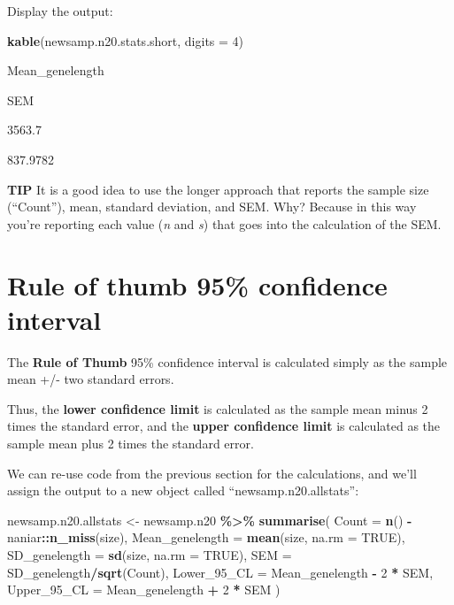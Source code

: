 \documentclass[
]{book}
\newenvironment{Shaded}{\begin{snugshade}}{\end{snugshade}}
\newcommand{\AttributeTok}[1]{\textcolor[rgb]{0.13,0.29,0.53}{#1}}
\newcommand{\ConstantTok}[1]{\textcolor[rgb]{0.56,0.35,0.01}{#1}}
\newcommand{\DecValTok}[1]{\textcolor[rgb]{0.00,0.00,0.81}{#1}}
\newcommand{\FunctionTok}[1]{\textcolor[rgb]{0.13,0.29,0.53}{\textbf{#1}}}
\newcommand{\NormalTok}[1]{#1}
\newcommand{\OtherTok}[1]{\textcolor[rgb]{0.56,0.35,0.01}{#1}}
\newcommand{\SpecialCharTok}[1]{\textcolor[rgb]{0.81,0.36,0.00}{\textbf{#1}}}
\begin{document}
Display the output:

\begin{Shaded}
\begin{Highlighting}[]
\FunctionTok{kable}\NormalTok{(newsamp.n20.stats.short, }\AttributeTok{digits =} \DecValTok{4}\NormalTok{)}
\end{Highlighting}
\end{Shaded}

Mean\_genelength

SEM

3563.7

837.9782

\textbf{TIP}
It is a good idea to use the longer approach that reports the sample size (``Count''), mean, standard deviation, and SEM. Why? Because in this way you're reporting each value (\emph{n} and \emph{s}) that goes into the calculation of the SEM.

\section{Rule of thumb 95\% confidence interval}\label{confint_rough}

The \textbf{Rule of Thumb} 95\% confidence interval is calculated simply as the sample mean +/- two standard errors.

Thus, the \textbf{lower confidence limit} is calculated as the sample mean minus 2 times the standard error, and the \textbf{upper confidence limit} is calculated as the sample mean plus 2 times the standard error.

We can re-use code from the previous section for the calculations, and we'll assign the output to a new object called ``newsamp.n20.allstats'':

\begin{Shaded}
\begin{Highlighting}[]
\NormalTok{newsamp.n20.allstats }\OtherTok{\textless{}{-}}\NormalTok{ newsamp.n20 }\SpecialCharTok{\%\textgreater{}\%}
  \FunctionTok{summarise}\NormalTok{(}
    \AttributeTok{Count =} \FunctionTok{n}\NormalTok{() }\SpecialCharTok{{-}}\NormalTok{ naniar}\SpecialCharTok{::}\FunctionTok{n\_miss}\NormalTok{(size),}
    \AttributeTok{Mean\_genelength =} \FunctionTok{mean}\NormalTok{(size, }\AttributeTok{na.rm =} \ConstantTok{TRUE}\NormalTok{),}
    \AttributeTok{SD\_genelength =} \FunctionTok{sd}\NormalTok{(size, }\AttributeTok{na.rm =} \ConstantTok{TRUE}\NormalTok{),}
    \AttributeTok{SEM =}\NormalTok{ SD\_genelength}\SpecialCharTok{/}\FunctionTok{sqrt}\NormalTok{(Count),}
    \AttributeTok{Lower\_95\_CL =}\NormalTok{ Mean\_genelength }\SpecialCharTok{{-}} \DecValTok{2} \SpecialCharTok{*}\NormalTok{ SEM,}
    \AttributeTok{Upper\_95\_CL =}\NormalTok{ Mean\_genelength }\SpecialCharTok{+} \DecValTok{2} \SpecialCharTok{*}\NormalTok{ SEM}
\NormalTok{  )}
\end{Highlighting}
\end{Shaded}
\end{document}
